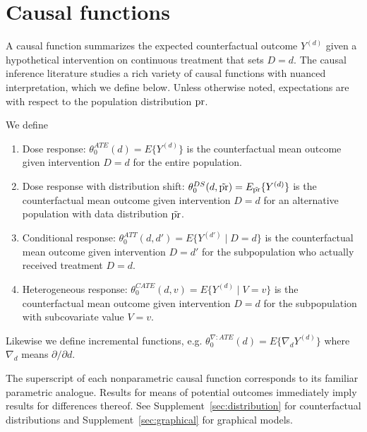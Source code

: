 \section{Causal functions}\label{sec:problem}


A causal function summarizes the expected counterfactual outcome $Y^{(d)}$ given a hypothetical intervention on continuous treatment that sets $D=d$. The causal inference literature studies a rich variety of causal functions with nuanced interpretation, which we define below. Unless otherwise noted, expectations are with respect to the population distribution $\text{\normalfont pr}$.

\begin{definition}\label{def:causal_param}
We define
\begin{enumerate}
    \item Dose response: $\theta_0^{ATE}(d)=E\{Y^{(d)}\}$ is the counterfactual mean outcome given intervention $D=d$ for the entire population.
     \item Dose response with distribution shift: $ \theta_0^{DS}(d,\tilde{\text{\normalfont pr}})=E_{\tilde{\text{\normalfont pr}}}\{Y^{(d)}\}$ is the counterfactual mean outcome given intervention $D=d$ for an alternative population with data distribution $\tilde{\text{\normalfont pr}}$. %
    \item Conditional response: $ \theta_0^{ATT}(d,d')=E\{Y^{(d')} \mid D=d\}$ is the counterfactual mean outcome given intervention $D=d'$ for the subpopulation who actually received treatment $D=d$.
     \item Heterogeneous response: $\theta_0^{CATE}(d,v)=E\{Y^{(d)} \mid V=v\}$ is the counterfactual mean outcome given intervention $D=d$ for the subpopulation with subcovariate value $V=v$.
\end{enumerate}
Likewise we define incremental functions, e.g. $\theta_0^{\nabla:ATE}(d)=E\{\nabla_d Y^{(d)}\}$ where $\nabla_d$ means $\partial / \partial d$.
\end{definition}
The superscript of each nonparametric causal function corresponds to its familiar parametric analogue. Results for means of potential outcomes immediately imply results for differences thereof. See Supplement~\ref{sec:distribution} for counterfactual distributions and Supplement~\ref{sec:graphical} for graphical models.

